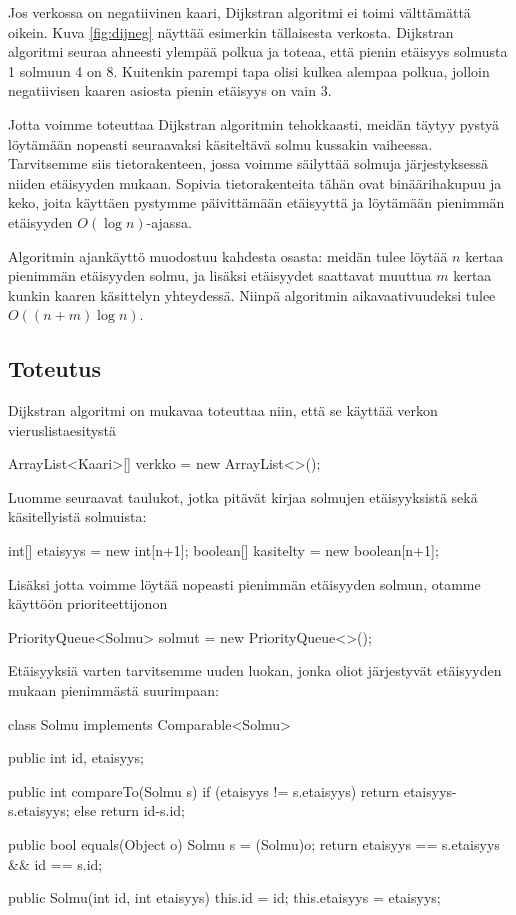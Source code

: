 Jos verkossa on negatiivinen kaari,
Dijkstran algoritmi ei toimi välttä\-mättä oikein.
Kuva \ref{fig:dijneg} näyttää esimerkin tällaisesta verkosta.
Dijkstran algoritmi seuraa ahneesti ylempää polkua ja toteaa,
että pienin etäisyys solmusta 1 solmuun 4 on 8.
Kuitenkin parempi tapa olisi kulkea alempaa polkua,
jolloin negatiivisen kaaren asiosta pienin etäisyys on vain 3.

Jotta voimme toteuttaa Dijkstran algoritmin tehokkaasti,
meidän täytyy pystyä löytämään nopeasti seuraavaksi käsiteltävä
solmu kussakin vaiheessa.
Tarvitsemme siis tietorakenteen, jossa voimme säilyttää
solmuja järjestykses\-sä niiden etäisyyden mukaan.
Sopivia tietorakenteita tähän ovat binääri\-hakupuu ja keko,
joita käyttäen pystymme päivittämään etäisyyttä ja löytämään
pienimmän etäisyyden $O(\log n)$-ajassa.

Algoritmin ajankäyttö muodostuu kahdesta osasta:
meidän tulee löytää $n$ kertaa pienimmän etäisyyden solmu,
ja lisäksi etäisyydet saattavat muuttua $m$ kertaa
kunkin kaaren käsittelyn yhteydessä.
Niinpä algoritmin aikavaativuudeksi tulee $O((n+m) \log n)$.

\subsection{Toteutus}

Dijkstran algoritmi on mukavaa toteuttaa niin, että
se käyttää verkon vieruslistaesitystä

\begin{code}
ArrayList<Kaari>[] verkko = new ArrayList<>();
\end{code}

Luomme seuraavat taulukot, jotka pitävät kirjaa solmujen etäisyyksistä
sekä käsitellyistä solmuista:

\begin{code}
int[] etaisyys = new int[n+1];
boolean[] kasitelty = new boolean[n+1];
\end{code}

Lisäksi jotta voimme löytää nopeasti pienimmän etäisyyden solmun,
otamme käyttöön prioriteettijonon

\begin{code}
PriorityQueue<Solmu> solmut = new PriorityQueue<>();
\end{code}

Etäisyyksiä varten tarvitsemme uuden luokan,
jonka oliot järjestyvät etäisyyden mukaan pienimmästä suurimpaan:

\begin{code}
class Solmu implements Comparable<Solmu> {
    public int id, etaisyys;

    public int compareTo(Solmu s) {
        if (etaisyys != s.etaisyys) return etaisyys-s.etaisyys;
        else return id-s.id;
    }

    public bool equals(Object o) {
        Solmu s = (Solmu)o;
        return etaisyys == s.etaisyys && id == s.id;
    }

    public Solmu(int id, int etaisyys) {
        this.id = id;
        this.etaisyys = etaisyys;
    }
}
\end{code}

